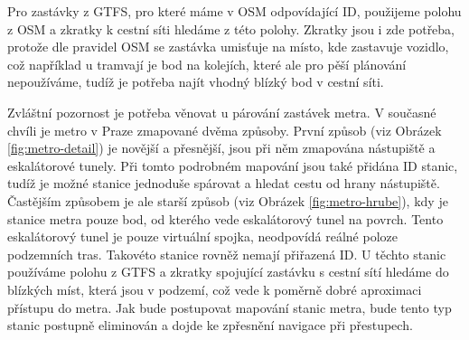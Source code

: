 Pro zastávky z GTFS, pro které máme v OSM odpovídající ID, použijeme polohu z
OSM a zkratky k cestní síti hledáme z této polohy. Zkratky jsou i zde potřeba,
protože dle pravidel OSM \cite{OSM} se zastávka umisťuje na místo, kde zastavuje
vozidlo, což například u tramvají je bod na kolejích, které ale pro pěší
plánování nepoužíváme, tudíž je potřeba najít vhodný blízký bod v cestní síti.

Zvláštní pozornost je potřeba věnovat u párování zastávek metra. V současné
chvíli je metro v Praze zmapované dvěma způsoby. První způsob (viz Obrázek \ref{fig:metro-detail}) je novější a
přesnější, jsou při něm zmapována nástupiště a eskalátorové tunely. Při tomto
podrobném mapování jsou také přidána ID stanic, tudíž je možné stanice jednoduše
spárovat a hledat cestu od hrany nástupiště. Častějším způsobem je ale starší
způsob (viz Obrázek \ref{fig:metro-hrube}), kdy je stanice metra pouze bod, od kterého vede eskalátorový tunel na
povrch. Tento eskalátorový tunel je pouze virtuální spojka, neodpovídá reálné
poloze podzemních tras. Takovéto stanice rovněž nemají přiřazená ID. U těchto
stanic používáme polohu z GTFS a zkratky spojující zastávku s cestní sítí
hledáme do blízkých míst, která jsou v podzemí, což vede k poměrně dobré
aproximaci přístupu do metra. Jak bude postupovat mapování stanic metra, bude
tento typ stanic postupně eliminován a dojde ke zpřesnění navigace při
přestupech.

